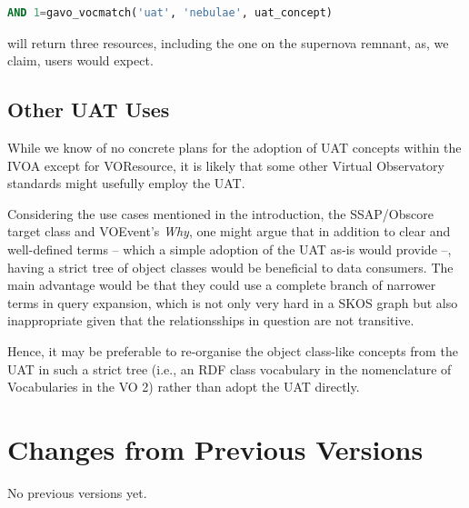 \documentclass[11pt,a4paper]{ivoa}
\begin{document}
\begin{lstlisting}[language=SQL]
    AND 1=gavo_vocmatch('uat', 'nebulae', uat_concept)
\end{lstlisting}

will return three resources, including the one on the supernova remnant,
as, we claim, users would expect.

\subsection{Other UAT Uses}

While we know of no concrete plans for the adoption of UAT concepts
within the IVOA except for
VOResource, it is likely that some other Virtual Observatory
standards might usefully employ the UAT.  

Considering the use cases mentioned in the introduction, the
SSAP/Obscore target class and VOEvent's \emph{Why}, one might argue that
in addition to clear and well-defined terms -- which a simple adoption
of the UAT as-is would provide --, having a strict tree of object
classes would be beneficial to data consumers.  The main advantage would
be that they could use a complete branch of narrower terms in query
expansion, which is not only very hard in a SKOS graph but also
inappropriate given that the relationsships in question are not
transitive.

Hence, it may be preferable to re-organise the object class-like
concepts from the UAT in such a strict tree (i.e., an RDF class
vocabulary in the nomenclature of Vocabularies in the VO 2) rather than
adopt the UAT directly.

\appendix
\section{Changes from Previous Versions}

No previous versions yet.  


\end{document}
